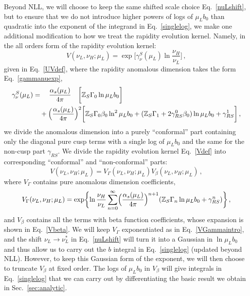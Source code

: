 \documentclass[a4,letterpaper,11pt]{article}
\newcommand{\nn}{\nonumber}
\newcommand{\be}{\begin{equation}}
\newcommand{\ee}{\end{equation}}
\newcommand{\as}{\alpha_s}
\newcommand{\zed}{\mathbb{Z}}
\newcommand{\eq}[1]{Eq.~\eqref{#1}}
\renewcommand{\sec}[1]{Sec.~\ref{sec:#1}}
\begin{document}
Beyond NLL, we will choose to keep the same shifted scale choice \eq{nuLshift}, but to ensure that we do not introduce higher powers of logs of $\mu_L b_0$ than quadratic into the exponent of the integrand in \eq{singlelog}, we make one additional modification to how we treat the rapidity evolution kernel. Namely, in the all orders form of the rapidity evolution kernel:
\be
\label{Vdef}
V(\nu_L,\nu_H;\mu_L) = \exp\biggl[ \gamma_\nu^S(\mu_L)\ln\frac{\nu_H}{\nu_L}\biggr]\,,
\ee
given in \eq{UVdef}, where the rapidity anomalous dimension takes the form \eq{gammanuexp},
\begin{align}
\gamma_\nu^S(\mu_L) &=  \quad  \frac{\as(\mu_L)}{4\pi} \quad \biggl[\zed_S \Gamma_0 \ln \mu_L b_0  \biggr] \\
&\quad +  \Bigl(\frac{\as(\mu_L)}{4\pi}\Bigr)^2 \biggl[ \zed_S \Gamma_0\beta_0 \ln^2 \mu_L b_0 +( \zed_S  \Gamma_1 + 2\gamma_{RS}^0 \beta_0 )\ln \mu_L b_0 + \gamma_{RS}^1\biggr] \,, \nn
\end{align}
we divide the anomalous dimension into a purely ``conformal'' part containing only the diagonal pure cusp terms with a single log of $\mu_L b_0$ and the same for the non-cusp part $\gamma_{RS}$. We divide the rapidity evolution kernel \eq{Vdef} into corresponding ``conformal'' and ``non-conformal'' parts:
\be
\label{Vdivision}
V(\nu_L,\nu_H;\mu_L) = V_\Gamma(\nu_L,\nu_H;\mu_L) V_\beta(\nu_L,\nu_H;\mu_L)\,,
\ee
where $V_\Gamma$ contains pure anomalous dimension coefficients,
\be
\label{VGammaintro}
V_\Gamma (\nu_L,\nu_H;\mu_L) = \exp\biggl\{ \ln\frac{\nu_H}{\nu_L} \sum_{n=0}^\infty \Bigl(\frac{\as(\mu_L)}{4\pi}\Bigr)^{n+1}(\zed_S \Gamma_n \ln\mu_L b_0 + \gamma_{RS}^n)\biggr\}\,,
\ee
and $V_\beta$ contains all the terms with beta function coefficients, whose expansion is shown in \eq{Vbeta}. We will keep $V_\Gamma$ exponentiated as in \eq{VGammaintro}, and the shift $\nu_L\to \nu_L^*$ in \eq{nuLshift} will turn it into a Gaussian in $\ln\mu_L b_0$ and thus  allow us to carry out the $b$ integral in \eq{singlelog} (updated beyond NLL). However, to keep this Gaussian form of the exponent, we will then choose to truncate $V_\beta$ at fixed order. The logs of $\mu_L b_0$ in $V_\beta$ will give integrals in \eq{singlelog} that we can carry out by differentiating the basic result we obtain in \sec{analytic}.
\end{document}

